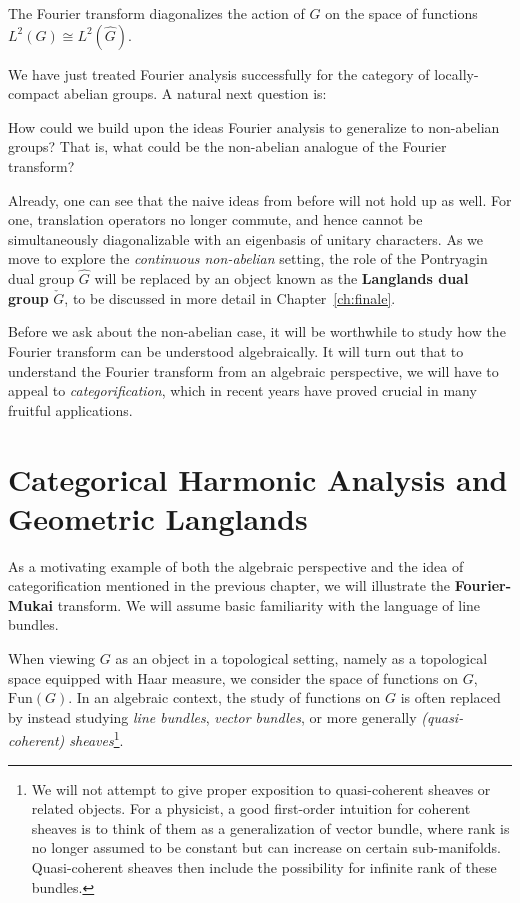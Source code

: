 \begin{fact}
	The Fourier transform diagonalizes the action of $G$ on the space of functions $L^2(G) \cong L^2(\hat G)$.
\end{fact}

We have just treated Fourier analysis successfully for the category of locally-compact abelian groups. A natural next question is:
\begin{ques}
	How could we build upon the ideas Fourier analysis to generalize to non-abelian groups? That is, what could be the non-abelian analogue of the Fourier transform?
\end{ques}
Already, one can see that the naive ideas from before will not hold up as well. For one, translation operators no longer commute, and hence cannot be simultaneously diagonalizable with an eigenbasis of unitary characters. As we move to explore the \emph{continuous non-abelian} setting, the role of the Pontryagin dual group $\hat G$ will be replaced by an object known as the \textbf{Langlands dual group} $\check G$, to be discussed in more detail in Chapter~\ref{ch:finale}.

Before we ask about the non-abelian case, it will be worthwhile to study how the Fourier transform can be understood algebraically. It will turn out that to understand the Fourier transform from an algebraic perspective, we will have to appeal to \emph{categorification}, which in recent years have proved crucial in many fruitful applications.


\section{Categorical Harmonic Analysis and Geometric Langlands} %
\label{sec:categorical_harmonic_analysis_and_geometric_langlands}

As a motivating example of both the algebraic perspective and the idea of categorification mentioned in the previous chapter, we will illustrate the \textbf{Fourier-Mukai} transform. We will assume basic familiarity with the language of line bundles. 

When viewing $G$ as an object in a topological setting, namely as a topological space equipped with Haar measure, we consider the space of functions on $G$, $\mathrm{Fun}(G)$. In an algebraic context, the study of functions on $G$ is often replaced by instead studying \emph{line bundles}, \emph{vector bundles}, or more generally \emph{(quasi-coherent) sheaves}\footnote{We will not attempt to give proper exposition to quasi-coherent sheaves or related objects. For a physicist, a good first-order intuition for coherent sheaves is to think of them as a generalization of vector bundle, where rank is no longer assumed to be constant but can increase on certain sub-manifolds. Quasi-coherent sheaves then include the possibility for infinite rank of these bundles.}.

